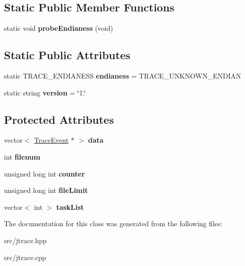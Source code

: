 \subsection*{Static Public Member Functions}
\begin{DoxyCompactItemize}
\item 
static void {\bfseries probe\+Endianess} (void)\hypertarget{classRTSim_1_1JavaTrace_a0637e7d77c2218bc3dc0a6ef22e5de7b}{}\label{classRTSim_1_1JavaTrace_a0637e7d77c2218bc3dc0a6ef22e5de7b}

\end{DoxyCompactItemize}
\subsection*{Static Public Attributes}
\begin{DoxyCompactItemize}
\item 
static T\+R\+A\+C\+E\+\_\+\+E\+N\+D\+I\+A\+N\+E\+SS {\bfseries endianess} = T\+R\+A\+C\+E\+\_\+\+U\+N\+K\+N\+O\+W\+N\+\_\+\+E\+N\+D\+I\+AN\hypertarget{classRTSim_1_1JavaTrace_a5fd8ed7bdbb813a51ecef064b5cf3f62}{}\label{classRTSim_1_1JavaTrace_a5fd8ed7bdbb813a51ecef064b5cf3f62}

\item 
static string {\bfseries version} = \char`\"{}1.\char`\"{}\hypertarget{classRTSim_1_1JavaTrace_a4341c0afc04110d51e4877c19fed56fd}{}\label{classRTSim_1_1JavaTrace_a4341c0afc04110d51e4877c19fed56fd}

\end{DoxyCompactItemize}
\subsection*{Protected Attributes}
\begin{DoxyCompactItemize}
\item 
vector$<$ \hyperlink{classRTSim_1_1TraceEvent}{Trace\+Event} $\ast$ $>$ {\bfseries data}\hypertarget{classRTSim_1_1JavaTrace_a93b126898a801b4dc30c351b43a53468}{}\label{classRTSim_1_1JavaTrace_a93b126898a801b4dc30c351b43a53468}

\item 
int {\bfseries filenum}\hypertarget{classRTSim_1_1JavaTrace_acdc95d0d598a20a1c3b10fa1f907ab41}{}\label{classRTSim_1_1JavaTrace_acdc95d0d598a20a1c3b10fa1f907ab41}

\item 
unsigned long int {\bfseries counter}\hypertarget{classRTSim_1_1JavaTrace_a1a39834408aa1eaa545fdf2ed62b0ba1}{}\label{classRTSim_1_1JavaTrace_a1a39834408aa1eaa545fdf2ed62b0ba1}

\item 
unsigned long int {\bfseries file\+Limit}\hypertarget{classRTSim_1_1JavaTrace_a77748363d6a841150b7fda121e9db005}{}\label{classRTSim_1_1JavaTrace_a77748363d6a841150b7fda121e9db005}

\item 
vector$<$ int $>$ {\bfseries task\+List}\hypertarget{classRTSim_1_1JavaTrace_aea04d59ab8c738e0bcc0f46839d26ef2}{}\label{classRTSim_1_1JavaTrace_aea04d59ab8c738e0bcc0f46839d26ef2}

\end{DoxyCompactItemize}


The documentation for this class was generated from the following files\+:\begin{DoxyCompactItemize}
\item 
src/jtrace.\+hpp\item 
src/jtrace.\+cpp\end{DoxyCompactItemize}
